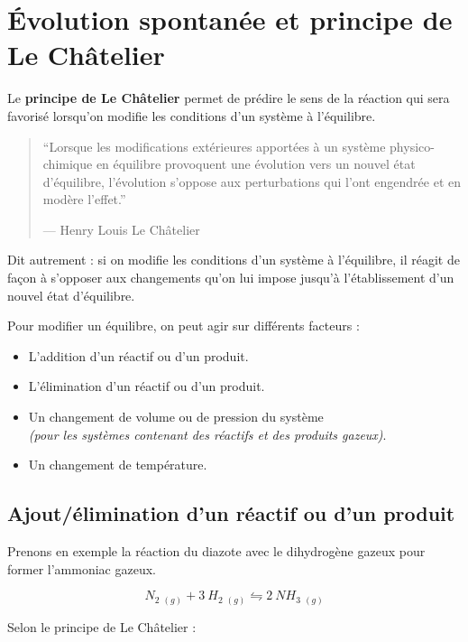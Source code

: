 \documentclass[
  11pt,
  a4paper,
  openany]{book}
\providecommand{\tightlist}{%
  \setlength{\itemsep}{0pt}\setlength{\parskip}{0pt}}
\begin{document}
\section{Évolution spontanée et principe de Le Châtelier}\label{uxe9volution-spontanuxe9e-et-principe-de-le-chuxe2telier}

Le \textbf{principe de Le Châtelier} permet de prédire le sens de la réaction qui sera favorisé lorsqu'on modifie les conditions d'un système à l'équilibre.

\begin{quote}
``Lorsque les modifications extérieures apportées à un système physico-chimique en équilibre provoquent une évolution vers un nouvel état d'équilibre, l'évolution s'oppose aux perturbations qui l'ont engendrée et en modère l'effet.''

--- Henry Louis Le Châtelier
\end{quote}

Dit autrement : si on modifie les conditions d'un système à l'équilibre, il réagit de façon à s'opposer aux changements qu'on lui impose jusqu'à l'établissement d'un nouvel état d'équilibre.

Pour modifier un équilibre, on peut agir sur différents facteurs :

\begin{itemize}
\tightlist
\item
  L'addition d'un réactif ou d'un produit.
\item
  L'élimination d'un réactif ou d'un produit.
\item
  Un changement de volume ou de pression du système\\
  \emph{(pour les systèmes contenant des réactifs et des produits gazeux)}.
\item
  Un changement de température.
\end{itemize}

\clearpage

\subsection{Ajout/élimination d'un réactif ou d'un produit}\label{ajoutuxe9limination-dun-ruxe9actif-ou-dun-produit}

Prenons en exemple la réaction du diazote avec le dihydrogène gazeux pour former l'ammoniac gazeux.

\[
N_2\ _{(g)} + 3\ H_2\ _{(g)} \leftrightharpoons 2\ NH_3\ _{(g)}
\]

Selon le principe de Le Châtelier :
\end{document}
